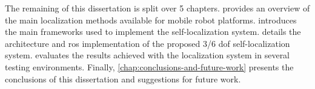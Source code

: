 The remaining of this dissertation is split over 5 chapters.  provides an overview of the main localization methods available for mobile robot platforms.  introduces the main frameworks used to implement the self-localization system.  details the architecture and \gls{ros} implementation of the proposed 3/6 \gls{dof} self-localization system.  evaluates the results achieved with the localization system in several testing environments. Finally, \cref{chap:conclusions-and-future-work} presents the conclusions of this dissertation and suggestions for future work.
